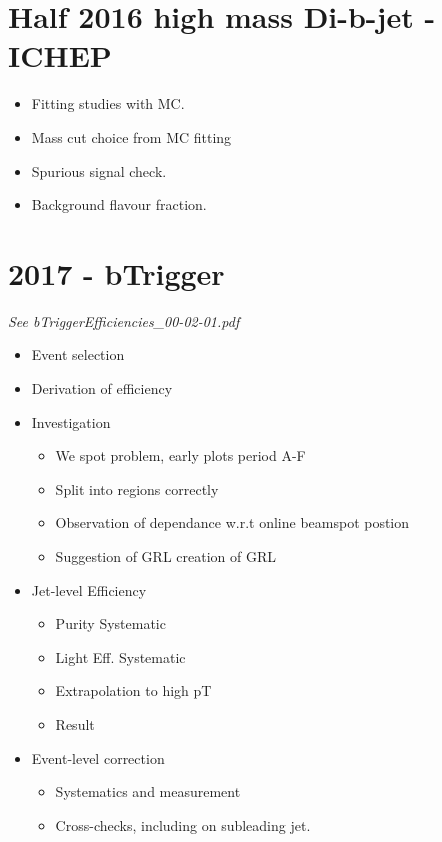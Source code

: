 \section{Half 2016 high mass Di-b-jet - ICHEP}

\begin{itemize}
\item{Fitting studies with MC.}
\item{Mass cut choice from MC fitting}
\item{Spurious signal check.}
\item{Background flavour fraction.}
\end{itemize}

\newpage
\section{2017 - bTrigger}
\textit{See bTriggerEfficiencies\_00-02-01.pdf}
\begin{itemize}
\item{Event selection}
\item{Derivation of efficiency}
\item{Investigation}
  \begin{itemize}[label={$-$}]
  \item{We spot problem, early plots period A-F}
  \item{Split into regions correctly}
  \item{Observation of dependance w.r.t online beamspot postion}
  \item{Suggestion of GRL creation of GRL}
  \end{itemize}
\item{Jet-level Efficiency}
  \begin{itemize}[label={$-$}]
  \item{Purity Systematic}
  \item{Light Eff. Systematic}
  \item{Extrapolation to high pT}
  \item{Result}
  \end{itemize}
\item{Event-level correction}
  \begin{itemize}[label={$-$}]
  \item{Systematics and measurement}
  \item{Cross-checks, including on subleading jet.}
  \end{itemize}
\end{itemize}

